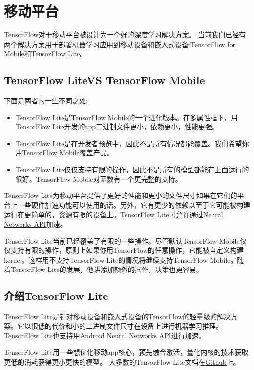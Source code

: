 \section{移动平台}
TensorFlow对于移动平台被设计为一个好的深度学习解决方案。
当前我们已经有两个解决方案用于部署机器学习应用到移动设备和嵌入式设备:\href{https://www.tensorflow.org/mobile/mobile_intro?hl=zh-cn}{TensorFlow for Mobile}和\href{https://www.tensorflow.org/mobile/tflite/index?hl=zh-cn}{TensorFlow Lite}。
\subsection{TensorFlow LiteVS TensorFlow Mobile}
下面是两者的一些不同之处:
\begin{itemize}
\item TensorFlow Lite是TensorFlow Mobile的一个进化版本。在多属性框下，用TensorFlow Lite开发的app二进制文件更小，依赖更小，性能更强。
\item TensorFlow Lite是在开发者预览中，因此不是所有情况都能覆盖。我们希望你用TensorFlow Mobile覆盖产品。
\item TensorFlow Lite仅仅支持有限的操作，因此不是所有的模型都能在上面运行的很好。TensorFlow Mobile对函数有一个更完整的支持。
\end{itemize}
TensorFlow Lite为移动平台提供了更好的性能和更小的文件尺寸如果在它们的平台上一些硬件加速功能可以使用的话。另外，它有更少的依赖以至于它可能被构建运行在更简单的，资源有限的设备上。TensorFlow Lite可允许通过\href{https://developer.android.com/ndk/guides/neuralnetworks/index.html?hl=zh-cn}{Neural Networks API}加速。

TensorFlow Lite当前已经覆盖了有限的一些操作。尽管默认TensorFlow Mobile仅仅支持有限的操作，原则上如果你用TensorFlow的任意操作，它能被自定义构建kernel。这样用不支持TensorFlow Lite的情况将继续支持TensorFlow Mobile。随着TensorFlow Lite的发展，他讲添加额外的操作，决策也更容易。
\subsection{介绍TensorFlow Lite}
TensorFlow Lite是针对移动设备和嵌入式设备的TensorFlow的轻量级的解决方案。它以很低的代价和小的二进制文件尺寸在设备上进行机器学习推理。TensorFlow Lite也支持用\href{https://developer.android.com/ndk/guides/neuralnetworks/index.html?hl=zh-cn}{Android Neural Networks API}进行加速。

TensorFlow Lite用一些想优化移动app核心，预先融合激活，量化内核的技术获取更低的消耗获得更小更快的模型。
大多数的TensorFlow Lite文档在\href{https://github.com/tensorflow/tensorflow/tree/master/tensorflow/contrib/lite}{Github}上。
